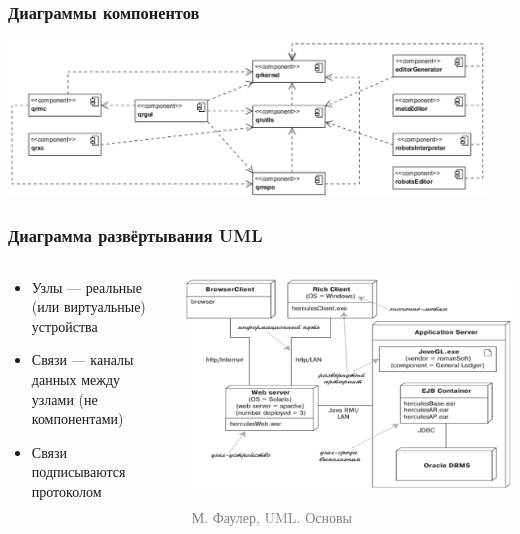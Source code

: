 \documentclass[xetex,mathserif,serif]{beamer}
\newcommand{\attribution}[1] {
    \vspace{-5mm}\begin{flushright}\begin{scriptsize}\textcolor{gray}{\textcopyright\, #1}\end{scriptsize}\end{flushright}
}
\begin{document}
    \begin{frame}
        \frametitle{Диаграммы компонентов}
        \begin{center}
            \includegraphics[width=0.95\textwidth]{componentDiagrams.png}
        \end{center}
    \end{frame}

    \begin{frame}
        \frametitle{Диаграмма развёртывания UML}
        \begin{columns}
            \begin{column}{0.5\textwidth}
                \begin{itemize}
                    \item Узлы --- реальные (или виртуальные) устройства
                    \item Связи --- каналы данных между узлами (не компонентами)
                    \item Связи подписываются протоколом
                \end{itemize}
            \end{column}
            \begin{column}{0.5\textwidth}
                \begin{center}
                    \includegraphics[width=\textwidth]{deploymentDiagram.png}
                    \attribution{М. Фаулер, UML. Основы}
                \end{center}
            \end{column}
        \end{columns}
    \end{frame}
\end{document}
